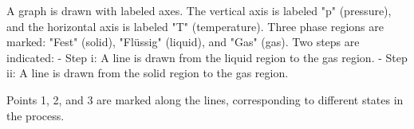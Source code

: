 A graph is drawn with labeled axes. The vertical axis is labeled "p" (pressure), and the horizontal axis is labeled "T" (temperature). Three phase regions are marked: "Fest" (solid), "Flüssig" (liquid), and "Gas" (gas). Two steps are indicated:  
- Step i: A line is drawn from the liquid region to the gas region.  
- Step ii: A line is drawn from the solid region to the gas region.  

Points 1, 2, and 3 are marked along the lines, corresponding to different states in the process.